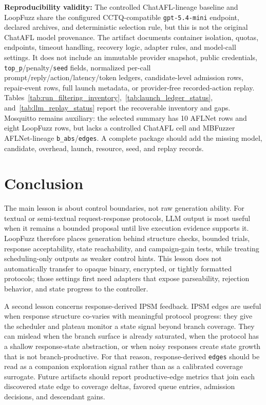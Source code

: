 \documentclass[final,5p,times,number]{elsarticle}
\begin{document}
\textbf{Reproducibility validity:} The controlled ChatAFL-lineage baseline and LoopFuzz share the configured CCTQ-compatible \texttt{gpt-5.4-mini} endpoint, declared archives, and deterministic selection rule, but this is not the original ChatAFL model provenance. The artifact documents container isolation, quotas, endpoints, timeout handling, recovery logic, adapter rules, and model-call settings. It does not include an immutable provider snapshot, public credentials, \texttt{top\_p}/penalty/\texttt{seed} fields, normalized per-call prompt/reply/action/latency/token ledgers, candidate-level admission rows, repair-event rows, full launch metadata, or provider-free recorded-action replay. Tables~\ref{tab:run_filtering_inventory},~\ref{tab:launch_ledger_status}, and~\ref{tab:llm_replay_status} report the recoverable inventory and gaps. Mosquitto remains auxiliary: the selected summary has 10 AFLNet rows and eight LoopFuzz rows, but lacks a controlled ChatAFL cell and MBFuzzer AFLNet-lineage \texttt{b\_abs}/\texttt{edges}. A complete package should add the missing model, candidate, overhead, launch, resource, seed, and replay records.

\section{Conclusion}
The main lesson is about control boundaries, not raw generation ability. For textual or semi-textual request-response protocols, LLM output is most useful when it remains a bounded proposal until live execution evidence supports it. LoopFuzz therefore places generation behind structure checks, bounded trials, response acceptability, state reachability, and campaign-gain tests, while treating scheduling-only outputs as weaker control hints. This lesson does not automatically transfer to opaque binary, encrypted, or tightly formatted protocols; those settings first need adapters that expose parseability, rejection behavior, and state progress to the controller.

A second lesson concerns response-derived IPSM feedback. IPSM edges are useful when response structure co-varies with meaningful protocol progress: they give the scheduler and plateau monitor a state signal beyond branch coverage. They can mislead when the branch surface is already saturated, when the protocol has a shallow response-state abstraction, or when noisy responses create state growth that is not branch-productive. For that reason, response-derived \texttt{edges} should be read as a companion exploration signal rather than as a calibrated coverage surrogate. Future artifacts should report productive-edge metrics that join each discovered state edge to coverage deltas, favored queue entries, admission decisions, and descendant gains.
\end{document}
